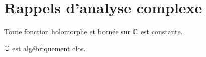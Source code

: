 \section{Rappels d'analyse complexe}

\begin{theorem}
	Toute fonction holomorphe et bornée sur $\mathbb{C}$ est constante.
	\label{thm:liouville_complex}
\end{theorem}

\begin{corollary}
	$\mathbb{C}$ est algébriquement clos.
\end{corollary}
